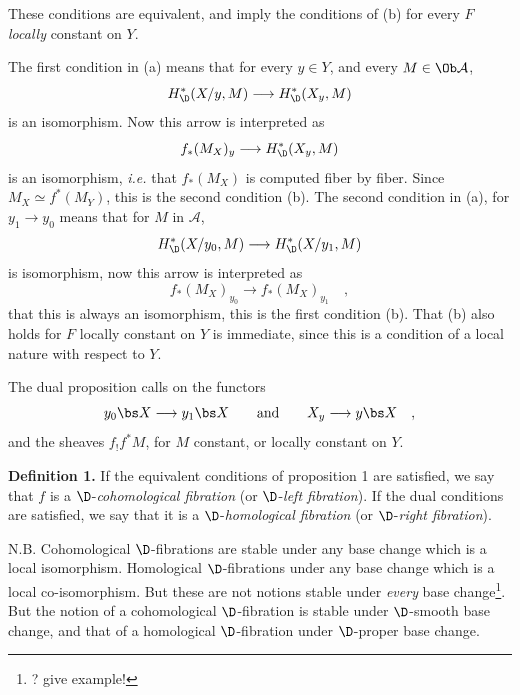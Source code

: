 These conditions are equivalent, and imply the conditions of (b) for every $F$ \textit{locally} constant on $Y$.

The first condition in (a) means that for every $y \in Y$, and every $M \in \Ob \mathcal{A}$,
\[
H^*_{\D}(X/y, M) \longrightarrow H^*_{\D}(X_y, M)
\]
is an isomorphism. Now this arrow is interpreted as
\[
f_*(M_X)_y \longrightarrow H^*_{\D}(X_y, M)
\]
is an isomorphism, \textit{i.e.} that $f_*(M_X)$ is computed fiber by fiber. Since $M_X \simeq f^*(M_Y)$, this is the second condition (b). The second condition in (a), for $y_1 \to y_0$ means that for $M$ in $\mathcal{A}$,
\[
H^*_{\D}(X/y_0, M) \longrightarrow H^*_{\D}(X/y_1, M)
\]
is isomorphism, now this arrow is interpreted as
\[
f_*(M_X)_{y_0} \longrightarrow f_*(M_X)_{y_1} \quad ,
\]
that this is always an isomorphism, this is the first condition (b). That (b) also holds for $F$ locally constant on $Y$ is immediate, since this is a condition of a local nature with respect to $Y$.


The dual proposition calls on the functors
\[
y_0\bs X \longrightarrow y_1\bs X \qquad \text{and} \qquad X_y \longrightarrow y\bs X \quad ,
\]
and the sheaves $f_!f^*M$, for $M$ constant, or locally constant on $Y$.

\textbf{Definition 1.} If the equivalent conditions of proposition 1 are satisfied, we say that $f$ is a $\D$-\textit{cohomological fibration} (or $\D$-\textit{left fibration}). If the dual conditions are satisfied, we say that it is a $\D$-\textit{homological fibration} (or $\D$-\textit{right fibration}).

N.B. Cohomological $\D$-fibrations are stable under any base change which is a local isomorphism. Homological $\D$-fibrations under any base change which is a local co-isomorphism. But these are not notions stable under \textit{every} base change\footnote[34]{? give example!}. But the notion of a cohomological $\D$-fibration is stable under $\D$-smooth base change, and that of a homological $\D$-fibration under $\D$-proper base change.

